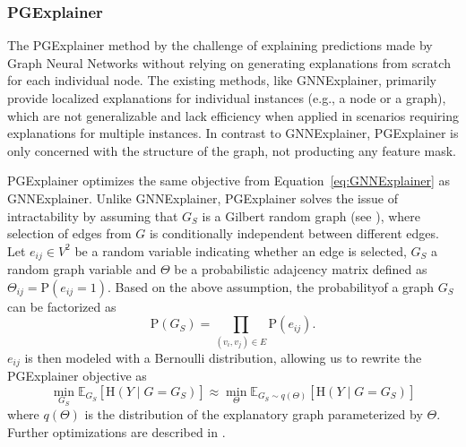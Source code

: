 \subsubsection{PGExplainer}

The PGExplainer method by \cite{luo_parameterized_2020} the challenge of explaining predictions made by Graph Neural Networks without relying on generating explanations from scratch for each individual node. The existing methods, like GNNExplainer, primarily provide localized explanations for individual instances (e.g., a node or a graph), which are not generalizable and lack efficiency when applied in scenarios requiring explanations for multiple instances. In contrast to GNNExplainer, PGExplainer is only concerned with the structure of the graph, not producting any feature mask.

PGExplainer optimizes the same objective from Equation~\ref{eq:GNNExplainer} as GNNExplainer. Unlike GNNExplainer, PGExplainer solves the issue of intractability by assuming that \( G_S \) is a Gilbert random graph (see \cite{gilbert_random_1959}), where selection of edges from \( G \) is conditionally independent between different edges. Let \( e_{ij} \in V^2 \) be a random variable indicating whether an edge is selected, \( G_S \) a random graph variable and \( \Theta \) be a probabilistic adajcency matrix defined as \( \Theta_{ij} = \mathrm{P} \left( e_{ij} = 1 \right) \). Based on the above assumption, the probabilityof a graph \( G_S \) can be factorized as
\begin{equation}
	\mathrm{P} \left( G_S \right) = \prod_{\left( v_i, v_j \right) \in E} \mathrm{P} \left( e_{ij} \right).
\end{equation}
\( e_{ij} \) is then modeled with a Bernoulli distribution, allowing us to rewrite the PGExplainer objective as
\begin{equation}
	\min_{G_S} \mathbb{E}_{G_S} \left[ \mathrm{H} \left( Y \middle| G = G_S \right) \right] \approx \min_{\Theta} \mathbb{E}_{G_S \sim q \left( \Theta \right)} \left[ \mathrm{H} \left( Y \middle| G = G_S \right) \right]
\end{equation}
where \( q \left( \Theta \right) \) is the distribution of the explanatory graph parameterized by \( \Theta \). Further optimizations are described in \cite{luo_parameterized_2020}.

